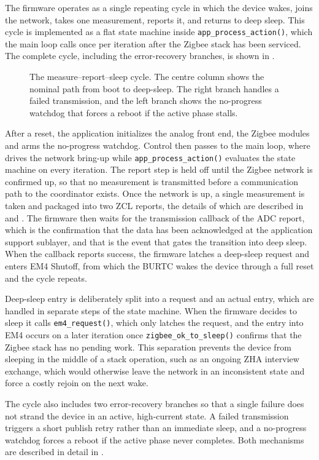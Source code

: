 The firmware operates as a single repeating cycle in which the device wakes, joins the network, takes one measurement, reports it, and returns to deep sleep.
This cycle is implemented as a flat state machine inside \texttt{app\_process\_action()}, which the main loop calls once per iteration after the Zigbee stack has been serviced.
The complete cycle, including the error-recovery branches, is shown in .

\begin{figure}
\centering

    \caption{The measure--report--sleep cycle. The centre column shows the nominal path from boot to deep-sleep. The right branch handles a failed transmission, and the left branch shows the no-progress watchdog that forces a reboot if the active phase stalls.}
    \label{fig:measure_report_sleep}
\end{figure}

After a reset, the application initializes the analog front end, the Zigbee modules and arms the no-progress watchdog.
Control then passes to the main loop, where  drives the network bring-up while \texttt{app\_process\_action()} evaluates the state machine on every iteration.
The report step is held off until the Zigbee network is confirmed up, so that no measurement is transmitted before a communication path to the coordinator exists.
Once the network is up, a single measurement is taken and packaged into two ZCL reports, the details of which are described in  and .
The firmware then waits for the transmission callback of the ADC report, which is the confirmation that the data has been acknowledged at the application support sublayer, and that is the event that gates the transition into deep sleep.
When the callback reports success, the firmware latches a deep-sleep request and enters EM4 Shutoff, from which the BURTC wakes the device through a full reset and the cycle repeats.
 
Deep-sleep entry is deliberately split into a request and an actual entry, which are handled in separate steps of the state machine.
When the firmware decides to sleep it calls \texttt{em4\_request()}, which only latches the request, and the entry into EM4 occurs on a later iteration once \texttt{zigbee\_ok\_to\_sleep()} confirms that the Zigbee stack has no pending work.
This separation prevents the device from sleeping in the middle of a stack operation, such as an ongoing ZHA interview exchange, which would otherwise leave the network in an inconsistent state and force a costly rejoin on the next wake.
 
The cycle also includes two error-recovery branches so that a single failure does not strand the device in an active, high-current state.
A failed transmission triggers a short publish retry rather than an immediate sleep, and a no-progress watchdog forces a reboot if the active phase never completes.
Both mechanisms are described in detail in .